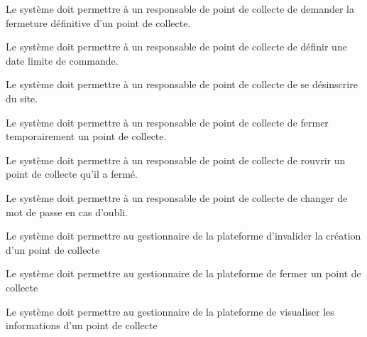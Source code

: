 \begin{reqs}{Le système doit permettre à un responsable de point de collecte de demander la fermeture définitive d’un point de collecte.}
\end{reqs}

\begin{reqs}{Le système doit permettre à un responsable de point de collecte de définir une date limite de commande.}
\end{reqs}

\begin{reqs}{Le système doit permettre à un responsable de point de collecte de se désinscrire du site.}
\end{reqs}

\begin{reqs}{Le système doit permettre à un responsable de point de collecte de fermer temporairement un point de collecte.}
\end{reqs}

\begin{reqs}{Le système doit permettre à un responsable de point de collecte de rouvrir un point de collecte qu’il a fermé.}
\end{reqs}

\begin{reqs}{Le système doit permettre à un responsable de point de collecte de changer de mot de passe en cas d’oubli.}
\end{reqs}



\begin{reqs} système doit permettre au gestionnaire de la plateforme de valider la création d'un point de collecte}
\end{reqs}

\begin{reqs}{Le système doit permettre au gestionnaire de la plateforme d'invalider la création d'un point de collecte}
\end{reqs}

\begin{reqs}{Le système doit permettre au gestionnaire de la plateforme de fermer un point de collecte}
\end{reqs}

\begin{reqs}{Le système doit permettre au gestionnaire de la plateforme de visualiser les informations d'un point de collecte}
\end{reqs}

